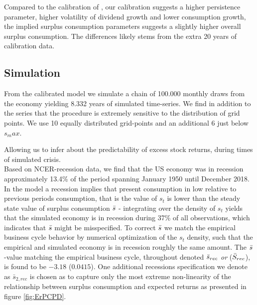 Compared to the calibration of \citet{Campbell1999}, our calibration suggests a higher persistence parameter, higher volatility of dividend growth and lower consumption growth, the implied surplus consumption parameters suggests a slightly higher overall surplus consumption. The differences likely stems from the extra 20 years of calibration data. \\

\subsection{Simulation}
From the calibrated model we simulate a chain of 100.000 monthly draws from the economy yielding 8.332 years of simulated time-series. We find in addition to the series that the procedure is extremely sensitive to the distribution of grid points. We use 10 equally distributed grid-points and an additional 6 just below $s_max$.




Allowing us to infer about the predictability of excess stock returns, during times of simulated crisis. 
\newline
\\
Based on NCER-recession data, we find that the US economy was in recession approximately 13.4\% of the period spanning January 1950 until December 2018.  In the model a recession implies that present consumption in low relative to previous periods consumption, that is the value of $s_t$ is lower than the steady state value of surplus consumption $\Bar{s}$ - integrating over the density of $s_t$ yields that the simulated economy is in recession during 37\% of all observations, which indicates that $\Bar{s}$ might be misspecified. To correct $\Bar{s}$ we match the empirical business cycle behavior by numerical optimization of the $s_t$ density, such that the empirical and simulated economy is in recession roughly the same amount. The $\Bar{s}$-value matching the empirical business cycle, throughout denoted $\Bar{s}_{rec}$ \textit{or} ($\Bar{S}_{rec}$), is found to be $-3.18$ ($0.0415$). One additional recessions specification we denote as $\bar{s}_{2,rec}$ is chosen as to capture only the most extreme non-linearity of the relationship between surplus consumption and expected returns as presented in figure \ref{fig:ErPCPD}.





